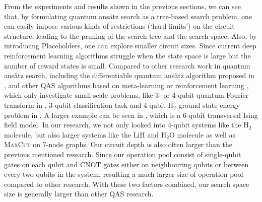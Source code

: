 \documentclass[a4paper,onecolumn,11pt]{quantumarticle}
\begin{document}
From the experiments and results shown in the previous sections, we can see that, by formulating quantum ans\"atz search as a tree-based search problem, one can easily impose various kinds of restrictions (`hard limits') on the circuit structure, leading to the pruning of the search tree and the search space. Also, by introducing Placeholders, one can explore smaller circuit sizes. Since current deep reinforcement learning algorithms struggle when the state space is large but the number of reward states is small. Compared to other research work in quantum ans\"atz search, including the differentiable quantum ans\"atz algorithm proposed in \cite{zhang2021differentiable}, and other QAS algorithms based on meta-learning \cite{chen2021quantum} or reinforcement learning \cite{kuo2021quantum}, which only investigate small-scale problems, like 3- or 4-qubit quantum Fourier transform in \cite{zhang2021differentiable}, 3-qubit classification task and 4-qubit $\text{H}_2$ ground state energy problem in \cite{du2020quantum}. A larger example can be seen in \cite{zhang2021neural}, which is a 6-qubit transversal Ising field model. In our research, we not only looked into 4-qubit systems like the $\text{H}_2$ molecule, but also larger systems like the $\text{LiH}$ and $\text{H}_2\text{O}$ molecule as well as \textsc{MaxCut} on 7-node graphs. Our circuit depth is also often larger than the previous mentioned research. Since our operation pool consist of single-qubit gates on each qubit and CNOT gates either on neighbouring qubits or between every two qubits in the system, resulting a much larger size of operation pool compared to other research. With these two factors combined, our search space size is generally larger than other QAS research.

\end{document}
